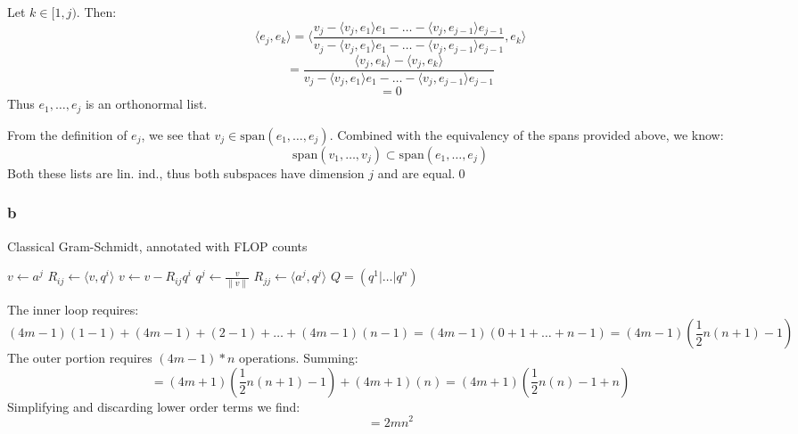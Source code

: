 \documentclass[11pt]{report}
\theoremstyle{definition}
\begin{document}
Let $k\in[1,j)$. Then:
\[
	\langle e_j,e_k\rangle =
	\bigg\langle
	\frac{v_j-\langle v_j,e_1\rangle e_1 -\ldots - \langle v_j, e_{j-1}\rangle e_{j-1}}
	{v_j-\langle v_j,e_1\rangle e_1 -\ldots - \langle v_j, e_{j-1}\rangle e_{j-1}}
	, e_k
	\bigg\rangle
\]
\[
	= \frac{\langle v_j,e_k\rangle - \langle v_j, e_k\rangle}
	{v_j-\langle v_j,e_1\rangle e_1 -\ldots - \langle v_j, e_{j-1}\rangle e_{j-1}}
\]
\[ = 0\]
Thus $e_1,\ldots,e_j$ is an orthonormal list.

From the definition of $e_j$, we see that $v_j\in\mathrm{span}(e_1,\ldots,e_j)$. Combined with the
equivalency of the spans provided above, we know:
\[\mathrm{span}(v_1,\ldots,v_j)\subset\mathrm{span}(e_1,\ldots,e_j)\]
Both these lists are lin. ind., thus both subspaces have dimension $j$ and are equal.\qed

\subsubsection*{b}

\begin{algorithm}
	\caption{Classical Gram-Schmidt, annotated with FLOP counts}
	\begin{algorithmic}
		\STATE $v\gets a^j$
		\STATE $R_{ij}\gets\langle v,q^i\rangle$ 
		\STATE $v\gets v-R_{ij}q^i$ 
		\ENDFOR {}
		\STATE $q^j\gets \frac{v}{\|v\|}$ 
		\STATE $R_{jj}\gets \langle a^j,q^j\rangle$ 
		\ENDFOR
		\STATE $Q = (q^1|\ldots|q^n)$
	\end{algorithmic}
\end{algorithm}
The inner loop requires:
\[(4m-1)(1-1)+(4m-1)+(2-1)+\ldots+(4m-1)(n-1) = (4m-1)(0+1+\ldots+n-1)=(4m-1)(\frac{1}{2}n(n+1)-1)\]
The outer portion requires $(4m-1)*n$ operations. Summing:
\[=(4m+1)(\frac{1}{2}n(n+1)-1)+(4m+1)(n)=(4m+1)(\frac{1}{2}n(n)-1+n)\]
Simplifying and discarding lower order terms we find:
\[=2mn^2\]
\end{document}
